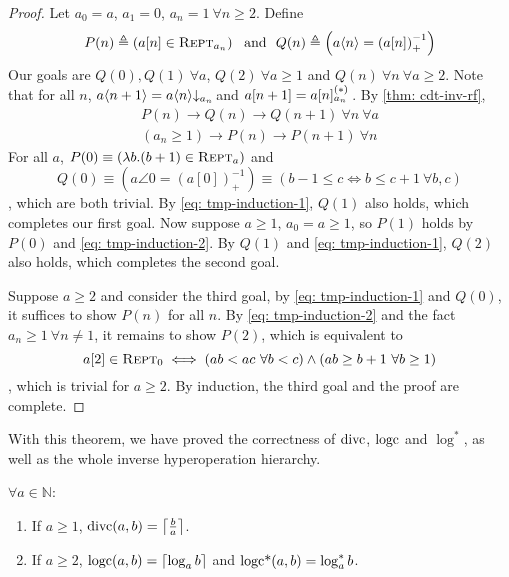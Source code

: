 \begin{proof}
Let $a_0 = a$, $a_1 = 0$, $a_n = 1 \ \forall n\ge 2$. Define
\begin{equation*}
P(n) \triangleq  \left(a[n] \in \text{\scshape{Rept}}_{a_n}\right)\ \text{ and } \
Q(n) \triangleq  \left(a\langle n\rangle = \left(a[n]\right)^{-1}_+ \right)
\end{equation*}
Our goals are $Q(0), Q(1) \ \forall a$, $Q(2) \ \forall a\ge 1$ and $Q(n) \ \forall n \ \forall a\ge 2$. Note that for all $n$, $a\angle{n+1} = \cdt{a\angle{n}}{a_n}$ and $a[n+1] = \rf{a[n]}{a_n}\ $. By \cref{thm: cdt-inv-rf},
\begin{align}
P(n) \to Q(n) \to Q(n+1) \ \forall n \ \forall a \label{eq: tmp-induction-1} \\
(a_n\ge 1) \to P(n) \to P(n+1) \ \forall n \label{eq: tmp-induction-2}
\end{align}
For all $a$, $P(0) \equiv \left(\lambda b.(b+1)\in \text{\scshape{Rept}}_a \right)$ and
\begin{equation*}
Q(0) \equiv \left(a\angle{0} = \left(a[0]\right)^{-1}_+\right) \equiv \left(b-1\le c \iff b\le c+1 \ \forall b, c \right)
\end{equation*}
, which are both trivial. By \eqref{eq: tmp-induction-1}, $Q(1)$ also holds, which completes our first goal. Now suppose $a\ge 1$, $a_0 = a\ge 1$, so $P(1)$ holds by $P(0)$ and \eqref{eq: tmp-induction-2}. By $Q(1)$ and \eqref{eq: tmp-induction-1}, $Q(2)$ also holds, which completes the second goal.

Suppose $a\ge 2$ and consider the third goal, by \eqref{eq: tmp-induction-1} and $Q(0)$, it suffices to show $P(n)$ for all $n$. By \eqref{eq: tmp-induction-2} and the fact $a_n\ge 1 \ \forall n\neq 1$, it remains to show $P(2)$, which is equivalent to
\begin{equation*}
a[2]\in \repeatable_0 \iff (ab < ac \ \forall b < c) \wedge (ab \ge b+1 \ \forall b\ge 1)
\end{equation*}
, which is trivial for $a\ge 2$. By induction, the third goal and the proof are complete.
\end{proof}
With this theorem, we have proved the correctness of $\text{divc}$, $\text{logc}$ and $\log^*$, as well as the whole inverse hyperoperation hierarchy.
\begin{col}
	$\forall a \in \mathbb{N}$:
	\begin{enumerate}
		\item If $a\ge 1$, $\text{divc}(a, b) = \left\lceil \frac{b}{a} \right\rceil$.
		\item If $a\ge 2$, $\text{logc}(a, b) = \left\lceil \log_ab \right\rceil $ and $\text{logc*}(a, b) = \log^*_ab$.
	\end{enumerate}
\end{col}
